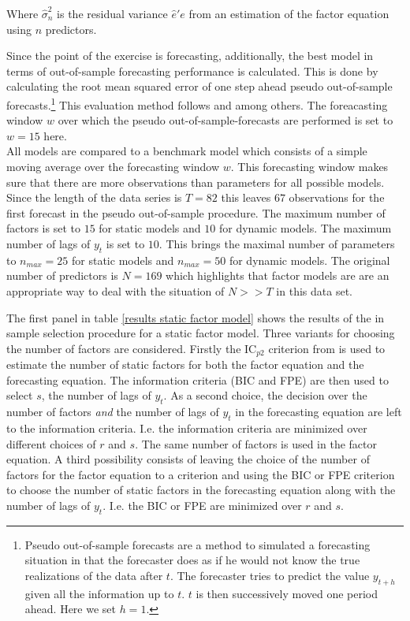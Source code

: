 \documentclass[12pt]{article}
\begin{document}
Where $\hat \sigma_n^2$ is the residual variance $\hat e'e$ from an estimation of the factor equation using $n$ predictors.

Since the point of the exercise is forecasting, additionally, the best model in terms of out-of-sample forecasting performance is calculated. This is done by calculating the root mean squared error of one step ahead pseudo out-of-sample forecasts.\footnote{Pseudo out-of-sample forecasts are a method to simulated a forecasting situation in that the forecaster does as if he would not know the true realizations of the data after $t$. The forecaster tries to predict the value $y_{t+h}$ given all the information up to $t$. $t$ is then successively moved one period ahead. Here we set $h=1$.} This evaluation method follows \citet{forni2005the} and \citet{bai2008forecasting} among others. The foreacasting window $w$ over which the pseudo out-of-sample-forecasts are performed is set to $w=15$ here. \\


All models are compared to a benchmark model which consists of a simple moving average over the forecasting window $w$. This forecasting window makes sure that there are more observations than parameters for all possible models. Since the length of the data series is $T=82$ this leaves $67$ observations for the first forecast in the pseudo out-of-sample procedure. The maximum number of factors is set to $15$ for static models and $10$ for dynamic models. The maximum number of lags of $y_t$ is set to $10$. This brings the maximal number of parameters to $n_{max} = 25$ for static models and $n_{max} = 50$ for dynamic models. The original number of predictors is $N = 169$ which highlights that factor models are are an appropriate way to deal with the situation of $N>>T$ in this data set.

The first panel in table \ref{results static factor model} shows the results of the in sample selection procedure for a static factor model. Three variants for choosing the number of factors are considered. Firstly the IC$_{p2}$ criterion from \citet{bai2002determining} is used to estimate the number of static factors for both the factor equation and the forecasting equation. The information criteria (BIC and FPE) are then used to select $s$, the number of lags of $y_t$.
As a second choice, the decision over the number of factors \textit{and} the number of lags of $y_t$ in the forecasting equation are left to the information criteria. I.e. the information criteria are minimized over different choices of $r$ and $s$. The same number of factors is used in the factor equation.
A third possibility consists of leaving the choice of the number of factors for the factor equation to a \citet{bai2002determining} criterion and using the BIC or FPE criterion to choose the number of static factors in the forecasting equation along with the number of lags of $y_t$. I.e. the BIC or FPE are minimized over $r$ and $s$.
\end{document}
